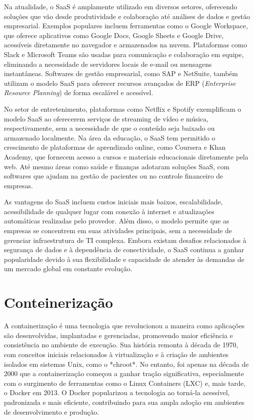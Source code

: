 Na atualidade, o SaaS é amplamente utilizado em diversos setores, oferecendo soluções que vão desde produtividade e colaboração até análises de dados e gestão empresarial. Exemplos populares incluem ferramentas como o Google Workspace, que oferece aplicativos como Google Docs, Google Sheets e Google Drive, acessíveis diretamente no navegador e armazenados na nuvem. Plataformas como Slack e Microsoft Teams são usadas para comunicação e colaboração em equipe, eliminando a necessidade de servidores locais de e-mail ou mensagens instantâneas. Softwares de gestão empresarial, como SAP e NetSuite, também utilizam o modelo SaaS para oferecer recursos avançados de ERP (\textit{Enterprise Resource Planning}) de forma escalável e acessível.

No setor de entretenimento, plataformas como Netflix e Spotify exemplificam o modelo SaaS ao oferecerem serviços de streaming de vídeo e música, respectivamente, sem a necessidade de que o conteúdo seja baixado ou armazenado localmente. Na área da educação, o SaaS tem permitido o crescimento de plataformas de aprendizado online, como Coursera e Khan Academy, que fornecem acesso a cursos e materiais educacionais diretamente pela web. Até mesmo áreas como saúde e finanças adotaram soluções SaaS, com softwares que ajudam na gestão de pacientes ou no controle financeiro de empresas.

As vantagens do SaaS incluem custos iniciais mais baixos, escalabilidade, acessibilidade de qualquer lugar com conexão à internet e atualizações automáticas realizadas pelo provedor. Além disso, o modelo permite que as empresas se concentrem em suas atividades principais, sem a necessidade de gerenciar infraestrutura de TI complexa. Embora existam desafios relacionados à segurança de dados e à dependência de conectividade, o SaaS continua a ganhar popularidade devido à sua flexibilidade e capacidade de atender às demandas de um mercado global em constante evolução.
\section{Conteinerização}

A containerização é uma tecnologia que revolucionou a maneira como aplicações são desenvolvidas, implantadas e gerenciadas, promovendo maior eficiência e consistência no ambiente de execução. Sua história remonta à década de 1970, com conceitos iniciais relacionados à virtualização e à criação de ambientes isolados em sistemas Unix, como o *chroot*. No entanto, foi apenas na década de 2000 que a containerização começou a ganhar tração significativa, especialmente com o surgimento de ferramentas como o Linux Containers (LXC) e, mais tarde, o Docker em 2013. O Docker popularizou a tecnologia ao torná-la acessível, padronizada e mais eficiente, contribuindo para sua ampla adoção em ambientes de desenvolvimento e produção.


